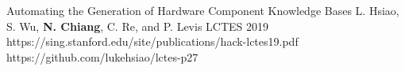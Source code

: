 



\begin{cvpapers}

  \cvpaper
    {Automating the Generation of Hardware Component Knowledge Bases} %
    {L. Hsiao, S. Wu, \textbf{N. Chiang}, C. Re, and P. Levis} %
    {LCTES} %
    {2019} %
    {https://sing.stanford.edu/site/publications/hack-lctes19.pdf} %
    {https://github.com/lukehsiao/lctes-p27} %

\end{cvpapers}
